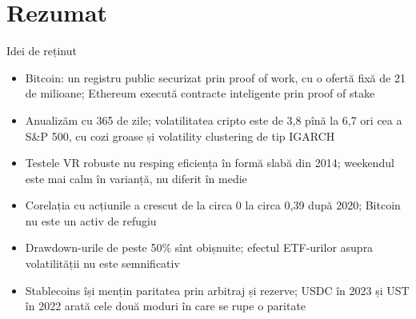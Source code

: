 \section{Rezumat}

\begin{frame}{Idei de reținut}
\itemsize{\small}
\begin{itemize}
    \item Bitcoin: un registru public securizat prin proof of work, cu o ofertă fixă de 21 de milioane; Ethereum execută contracte inteligente prin proof of stake
    \item Anualizăm cu 365 de zile; volatilitatea cripto este de 3{,}8 pînă la 6{,}7 ori cea a S\&P 500, cu cozi groase și volatility clustering de tip IGARCH
    \item Testele VR robuste nu resping eficiența în formă slabă din 2014; weekendul este mai calm în varianță, nu diferit în medie
    \item Corelația cu acțiunile a crescut de la circa 0 la circa 0{,}39 după 2020; Bitcoin nu este un activ de refugiu
    \item Drawdown-urile de peste 50\% sînt obișnuite; efectul ETF-urilor asupra volatilității nu este semnificativ
    \item Stablecoins își mențin paritatea prin arbitraj și rezerve; USDC în 2023 și UST în 2022 arată cele două moduri în care se rupe o paritate
\end{itemize}
\end{frame}

